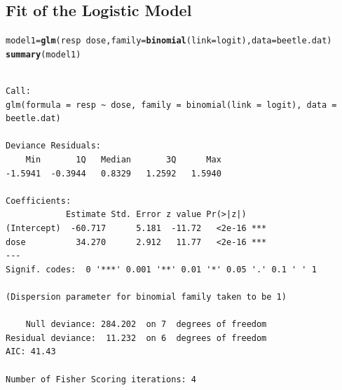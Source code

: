\documentclass[oneside]{book}\usepackage[]{graphicx}\usepackage[svgnames]{xcolor}
\makeatletter
\newcommand{\hlopt}[1]{\textcolor[rgb]{0,0,0}{#1}}%
\newcommand{\hlstd}[1]{\textcolor[rgb]{0.345,0.345,0.345}{#1}}%
\newcommand{\hlkwb}[1]{\textcolor[rgb]{0.69,0.353,0.396}{#1}}%
\newcommand{\hlkwc}[1]{\textcolor[rgb]{0.333,0.667,0.333}{#1}}%
\newcommand{\hlkwd}[1]{\textcolor[rgb]{0.737,0.353,0.396}{\textbf{#1}}}%
\newenvironment{kframe}{%
 \def\at@end@of@kframe{}%
 \ifinner\ifhmode%
  \def\at@end@of@kframe{\end{minipage}}%
  \begin{minipage}{\columnwidth}%
 \fi\fi%
 \def\FrameCommand##1{\hskip\@totalleftmargin \hskip-\fboxsep
 \colorbox{shadecolor}{##1}\hskip-\fboxsep
     \hskip-\linewidth \hskip-\@totalleftmargin \hskip\columnwidth}%
 \MakeFramed {\advance\hsize-\width
   \@totalleftmargin\z@ \linewidth\hsize
   \@setminipage}}%
 {\par\unskip\endMakeFramed%
 \at@end@of@kframe}
\newenvironment{knitrout}{}{} %
\makeatother
\begin{document}
\subsection*{Fit of the Logistic Model}
\begin{knitrout}
\color{fgcolor}\begin{kframe}
\begin{alltt}
\hlstd{model1} \hlkwb{=} \hlkwd{glm}\hlstd{(resp} \hlopt{~} \hlstd{dose,} \hlkwc{family} \hlstd{=} \hlkwd{binomial}\hlstd{(}\hlkwc{link} \hlstd{= logit),} \hlkwc{data} \hlstd{= beetle.dat)}
\hlkwd{summary}\hlstd{(model1)}
\end{alltt}
\begin{verbatim}

Call:
glm(formula = resp ~ dose, family = binomial(link = logit), data = beetle.dat)

Deviance Residuals: 
    Min       1Q   Median       3Q      Max  
-1.5941  -0.3944   0.8329   1.2592   1.5940  

Coefficients:
            Estimate Std. Error z value Pr(>|z|)    
(Intercept)  -60.717      5.181  -11.72   <2e-16 ***
dose          34.270      2.912   11.77   <2e-16 ***
---
Signif. codes:  0 '***' 0.001 '**' 0.01 '*' 0.05 '.' 0.1 ' ' 1

(Dispersion parameter for binomial family taken to be 1)

    Null deviance: 284.202  on 7  degrees of freedom
Residual deviance:  11.232  on 6  degrees of freedom
AIC: 41.43

Number of Fisher Scoring iterations: 4
\end{verbatim}
\end{kframe}
\end{knitrout}
\end{document}
